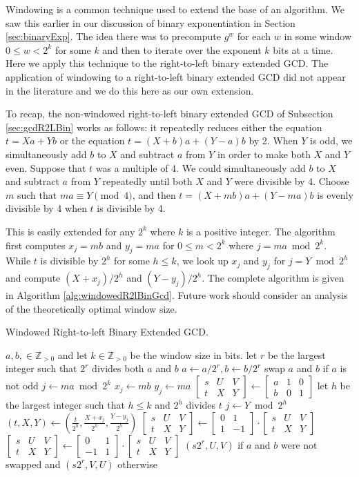 \documentclass{ucalgthes1}
\theoremstyle{definition}
\newcommand{\ZZgtz}{\mathbb{Z}_{>0}}
\newcommand{\matrixtt}[4]{\left[ \begin{array}{rr} #1 & #2 \\ #3 & #4 \end{array} \right]}
\newcommand{\matrixThreeTwo}[6]{\left[ \begin{array}{rrr} #1 & #2 & #3 \\ #4 & #5 & #6 \end{array} \right]}
\begin{document}
Windowing is a common technique used to extend the base of an algorithm.  We saw this earlier in our discussion of binary exponentiation in Section \ref{sec:binaryExp}.  The idea there was to precompute $g^w$ for each $w$ in some window $0 \le w < 2^k$ for some $k$ and then to iterate over the exponent $k$ bits at a time.  Here we apply this technique to the right-to-left binary extended GCD.  The application of windowing to a right-to-left binary extended GCD did not appear in the literature and we do this here as our own extension.  

To recap, the non-windowed right-to-left binary extended GCD of Subsection \ref{sec:gcdR2LBin} works as follows: it repeatedly reduces either the equation $t=Xa+Yb$ or the equation $t=(X+b)a+(Y-a)b$ by 2. When $Y$ is odd, we simultaneously add $b$ to $X$ and subtract $a$ from $Y$ in order to make both $X$ and $Y$ even.  Suppose that $t$ was a multiple of 4.  We could simultaneously add $b$ to $X$ and subtract $a$ from $Y$ repeatedly until both $X$ and $Y$ were divisible by 4.  Choose $m$ such that $ma \equiv Y \pmod 4$, and then $t = (X+mb)a + (Y-ma)b$ is evenly divisible by 4 when $t$ is divisible by 4.

This is easily extended for any $2^k$ where $k$ is a positive integer.  The algorithm first computes $x_j = mb$ and $y_j = ma$ for $0 \le m < 2^k$ where $j = ma \bmod 2^k$.  While $t$ is divisible by $2^h$ for some $h \le k$, we look up $x_j$ and $y_j$ for $j = Y \bmod 2^h$ and compute $(X + x_j) / 2^h$ and $(Y - y_j) / 2^h$.  The complete algorithm is given in Algorithm \ref{alg:windowedR2lBinGcd}.  Future work should consider an analysis of the theoretically optimal window size.

\begin{algorithm}[htb]
\caption{Windowed Right-to-left Binary Extended GCD.}
\label{alg:windowedR2lBinGcd}
\begin{algorithmic}[1]
\Require $a,b, \in \ZZgtz$ and let $k \in \ZZgtz$ be the window size in bits.
\State let $r$ be the largest integer such that $2^r$ divides both $a$ and $b$
\State $a \gets a / 2^r, b \gets b / 2^r$
\State swap $a$ and $b$ if $a$ is not odd
	\State $j \gets ma \bmod 2^k$
	\State $x_j \gets mb$
	\State $y_j \gets ma$
\EndFor
\State $\matrixThreeTwo{s}{U}{V}{t}{X}{Y} \gets \matrixThreeTwo{a}{1}{0}{b}{0}{1}$
		\State let $h$ be the largest integer such that $h \le k$ and $2^h$ divides $t$
		\State $j \gets Y \bmod 2^h$
		\State $(t, X, Y) \gets \left( \frac{t}{2^h}, \frac{X+x_j}{2^h}, \frac{Y-y_j}{2^h} \right)$  
	\EndWhile
		\State $\matrixThreeTwo{s}{U}{V}{t}{X}{Y} \gets \matrixtt{0}{1}{1}{-1} \cdot \matrixThreeTwo{s}{U}{V}{t}{X}{Y}$
	\Else
		\State $\matrixThreeTwo{s}{U}{V}{t}{X}{Y} \gets \matrixtt{0}{1}{-1}{1} \cdot \matrixThreeTwo{s}{U}{V}{t}{X}{Y}$
	\EndIf
\EndWhile
\State \Return $(s2^r, U, V)$ if $a$ and $b$ were not swapped and $(s2^r, V, U)$ otherwise
\end{algorithmic}
\end{algorithm}
\end{document}
